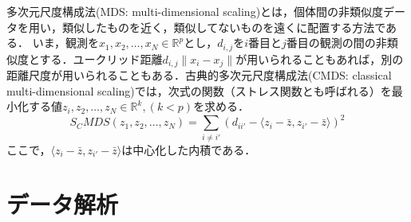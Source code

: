 \documentclass{jarticle}
\begin{document}
多次元尺度構成法(MDS: multi-dimensional scaling)とは，個体間の非類似度データを用い，類似したものを近く，類似してないものを遠くに配置する方法である．
いま，観測を$x_1, x_2,\dots,x_N\in \mathbb R^p$とし，$d_{i,j}$を$i$番目と$j$番目の観測の間の非類似度とする．ユークリッド距離$d_{i,j}\|x_i - x_j\|$が用いられることもあれば，別の距離尺度が用いられることもある．古典的多次元尺度構成法(CMDS: classical multi-dimensional scaling)では，次式の関数（ストレス関数とも呼ばれる）を最小化する値$z_i, z_2,\dots,z_N\in\mathbb R^k, (k<p)$を求める．
$$
S_CMDS(z_1, z_2, \dots,z_N) = \sum_{i\neq i'}(d_{ii'} - \langle z_i - \bar{z}, z_{i'} - \bar z \rangle)^2
$$
ここで，$\langle z_i - \bar{z}, z_{i'} - \bar z \rangle$は中心化した内積である．






\section{データ解析}
\end{document}
